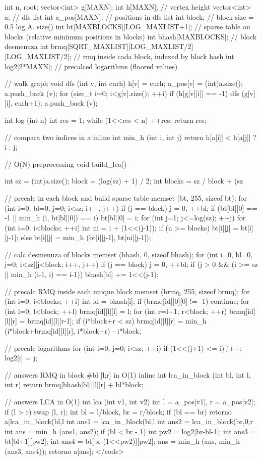 int n, root;
vector<int> g[MAXN];
int h[MAXN]; // vertex height
vector<int> a; // dfs list
int a_pos[MAXN]; // positions in dfs list
int block; // block size = 0.5 log A. size()
int bt[MAXBLOCKS][LOG_MAXLIST+1]; // sparse table on blocks (relative minimum positions in blocks)
int bhash[MAXBLOCKS]; // block desmenuza
int brmq[SQRT_MAXLIST][LOG_MAXLIST/2][LOG_MAXLIST/2]; // rmq inside cada block, indexed by block hash
int log2[2*MAXN]; // precalced logarithms (floored values)

// walk graph
void dfs (int v, int curh) {
h[v] = curh;
a_pos[v] = (int)a.size();
a.push_back (v);
for (size_t i=0; i<g[v].size(); ++i)
if (h[g[v][i]] == -1) {
dfs (g[v][i], curh+1);
a.push_back (v);
}
}

int log (int n) {
int res = 1;
while (1<<res < n) ++res;
return res;
}

// compara two indices in a
inline int min_h (int i, int j) {
return h[a[i]] < h[a[j]] ? i : j;
}

// O(N) preprocessing
void build_lca() {
int sz = (int)a.size();
block = (log(sz) + 1) / 2;
int blocks = sz / block + (sz %

// precalc in each block and build sparse table
memset (bt, 255, sizeof bt);
for (int i=0, bl=0, j=0; i<sz; i++, j++) {
if (j == block)
j = 0, ++bl;
if (bt[bl][0] == -1 || min_h (i, bt[bl][0]) == i)
bt[bl][0] = i;
}
for (int j=1; j<=log(sz); ++j)
for (int i=0; i<blocks; ++i) {
int ni = i + (1<<(j-1));
if (n >= blocks)
bt[i][j] = bt[i][j-1];
else
bt[i][j] = min_h (bt[i][j-1], bt[ni][j-1]);
}

// calc desmenuza of blocks
memset (bhash, 0, sizeof bhash);
for (int i=0, bl=0, j=0; i<sz||j<block; i++, j++) {
if (j == block)
j = 0, ++bl;
if (j > 0 && (i >= sz || min_h (i-1, i) == i-1))
bhash[bl] += 1<<(j-1);
}

// precalc RMQ inside each unique block
memset (brmq, 255, sizeof brmq);
for (int i=0; i<blocks; ++i) {
int id = bhash[i];
if (brmq[id][0][0] != -1) continue;
for (int l=0; l<block; ++l) {
brmq[id][l][l] = l;
for (int r=l+1; r<block; ++r) {
brmq[id][l][r] = brmq[id][l][r-1];
if (i*block+r < sz)
brmq[id][l][r] =
min_h (i*block+brmq[id][l][r], i*block+r) - i*block;
}
}
}

// precalc logarithms
for (int i=0, j=0; i<sz; ++i) {
if (1<<(j+1) <= i) j++;
log2[i] = j;
}
}

// answers RMQ in block #bl [l;r] in O(1)
inline int lca_in_block (int bl, int l, int r) {
return brmq[bhash[bl]][l][r] + bl*block;
}

// answers LCA in O(1)
int lca (int v1, int v2) {
int l = a_pos[v1], r = a_pos[v2];
if (l > r) swap (l, r);
int bl = l/block, br = r/block;
if (bl == br)
retorno a[lca_in_block(bl,l%
int ans1 = lca_in_block(bl,l%
int ans2 = lca_in_block(br,0,r%
int ans = min_h (ans1, ans2);
if (bl < br - 1) {
int pw2 = log2[br-bl-1];
int ans3 = bt[bl+1][pw2];
int ans4 = bt[br-(1<<pw2)][pw2];
ans = min_h (ans, min_h (ans3, ans4));
}
retorno a[ans];
}</code>